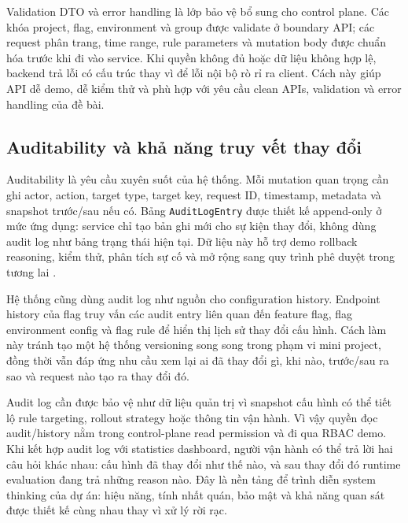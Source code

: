 Validation DTO và error handling là lớp bảo vệ bổ sung cho control plane. Các khóa project, flag, environment và group được validate ở boundary API; các request phân trang, time range, rule parameters và mutation body được chuẩn hóa trước khi đi vào service. Khi quyền không đủ hoặc dữ liệu không hợp lệ, backend trả lỗi có cấu trúc thay vì để lỗi nội bộ rò rỉ ra client. Cách này giúp API dễ demo, dễ kiểm thử và phù hợp với yêu cầu clean APIs, validation và error handling của đề bài.

\subsection{Auditability và khả năng truy vết thay đổi}

Auditability là yêu cầu xuyên suốt của hệ thống. Mỗi mutation quan trọng cần ghi actor, action, target type, target key, request ID, timestamp, metadata và snapshot trước/sau nếu có. Bảng \texttt{AuditLogEntry} được thiết kế append-only ở mức ứng dụng: service chỉ tạo bản ghi mới cho sự kiện thay đổi, không dùng audit log như bảng trạng thái hiện tại. Dữ liệu này hỗ trợ demo rollback reasoning, kiểm thử, phân tích sự cố và mở rộng sang quy trình phê duyệt trong tương lai \cite{owasp_logging}.

Hệ thống cũng dùng audit log như nguồn cho configuration history. Endpoint history của flag truy vấn các audit entry liên quan đến feature flag, flag environment config và flag rule để hiển thị lịch sử thay đổi cấu hình. Cách làm này tránh tạo một hệ thống versioning song song trong phạm vi mini project, đồng thời vẫn đáp ứng nhu cầu xem lại ai đã thay đổi gì, khi nào, trước/sau ra sao và request nào tạo ra thay đổi đó.

Audit log cần được bảo vệ như dữ liệu quản trị vì snapshot cấu hình có thể tiết lộ rule targeting, rollout strategy hoặc thông tin vận hành. Vì vậy quyền đọc audit/history nằm trong control-plane read permission và đi qua RBAC demo. Khi kết hợp audit log với statistics dashboard, người vận hành có thể trả lời hai câu hỏi khác nhau: cấu hình đã thay đổi như thế nào, và sau thay đổi đó runtime evaluation đang trả những reason nào. Đây là nền tảng để trình diễn system thinking của dự án: hiệu năng, tính nhất quán, bảo mật và khả năng quan sát được thiết kế cùng nhau thay vì xử lý rời rạc.
